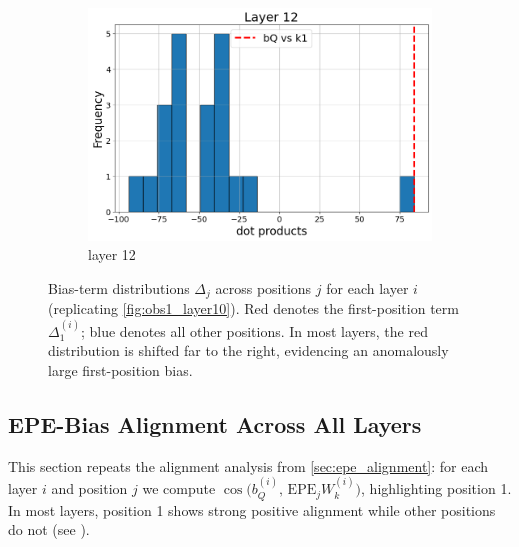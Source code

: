 \documentclass[11pt]{article}
\begin{document}
\begin{figure}[t]
\begin{subfigure}[t]{0.24\textwidth}
    \includegraphics[width=1.4\columnwidth]{figures/obs1_appendix/obs1_layer12.png}
    \caption{layer 12}
  \end{subfigure}\hfill
  \vspace{2mm}
  \caption{Bias-term distributions $\Delta_j$ across positions $j$ for each layer $i$ (replicating \cref{fig:obs1_layer10}). Red denotes the first-position term $\Delta_1^{(i)}$; blue denotes all other positions. In most layers, the red distribution is shifted far to the right, evidencing an anomalously large first-position bias.}
  \label{fig:appendix_obs1_all_layers}
\end{figure}

\subsection{EPE-Bias Alignment Across All Layers}\label{app:epe_bias}

This section repeats the alignment analysis from \cref{sec:epe_alignment}: for each layer $i$ and position $j$ we compute $\cos\big(b_Q^{(i)},\, \mathrm{EPE}_jW_k^{(i)}\big)$, highlighting position 1. In most layers, position 1 shows strong positive alignment while other positions do not (see ).
\end{document}
